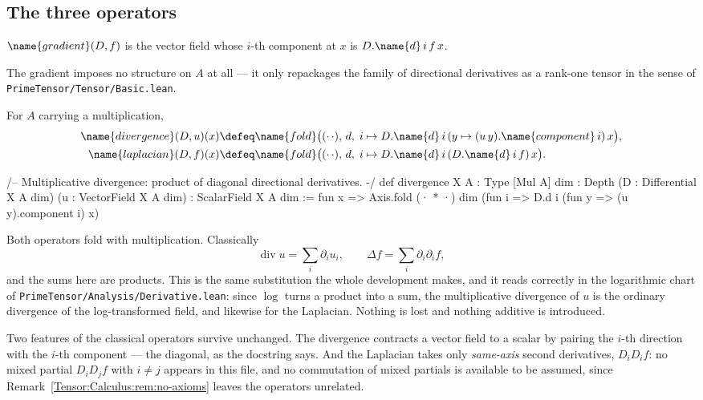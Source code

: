 \subsection{The three operators}

\begin{definition}\label{Tensor:Calculus:def:gradient}
$\name{gradient}(D,f)$ is the vector field whose $i$-th component at $x$ is
$D.\name{d}\,i\,f\,x$.
\end{definition}

The gradient imposes no structure on $A$ at all --- it only repackages the
family of directional derivatives as a rank-one tensor in the sense of
\texttt{PrimeTensor/Tensor/Basic.lean}.

\begin{definition}
\label{Tensor:Calculus:def:div-lap}
For $A$ carrying a multiplication,
\begin{align*}
  \name{divergence}(D,u)(x)
    &\defeq \name{fold}\bigl((\cdot\,\cdot),\, d,\;
       i \mapsto D.\name{d}\,i\,(y \mapsto (u\,y).\name{component}\,i)\,x\bigr), \\
  \name{laplacian}(D,f)(x)
    &\defeq \name{fold}\bigl((\cdot\,\cdot),\, d,\;
       i \mapsto D.\name{d}\,i\,(D.\name{d}\,i\,f)\,x\bigr).
\end{align*}
\end{definition}

\begin{leancode}
/-- Multiplicative divergence: product of diagonal directional derivatives. -/
def divergence {X A : Type} [Mul A] {dim : Depth}
    (D : Differential X A dim) (u : VectorField X A dim) : ScalarField X A dim :=
  fun x =>
    Axis.fold (· * ·) dim (fun i =>
      D.d i (fun y => (u y).component i) x)
\end{leancode}

\begin{designnote}
\label{Tensor:Calculus:note:product}
Both operators fold with multiplication.  Classically
\[
  \operatorname{div} u = \sum_i \partial_i u_i,
  \qquad
  \Delta f = \sum_i \partial_i \partial_i f,
\]
and the sums here are products.  This is the same substitution the whole
development makes, and it reads correctly in the logarithmic chart of
\texttt{PrimeTensor/Analysis/Derivative.lean}: since $\log$ turns a product
into a sum, the multiplicative divergence of $u$ is the ordinary divergence of
the log-transformed field, and likewise for the Laplacian.  Nothing is lost and
nothing additive is introduced.

Two features of the classical operators survive unchanged.  The divergence
contracts a vector field to a scalar by pairing the $i$-th direction with the
$i$-th component --- the diagonal, as the docstring says.  And the Laplacian
takes only \emph{same-axis} second derivatives, $D_i D_i f$: no mixed partial
$D_i D_j f$ with $i \neq j$ appears in this file, and no commutation of mixed
partials is available to be assumed, since
Remark~\ref{Tensor:Calculus:rem:no-axioms} leaves the operators unrelated.
\end{designnote}

